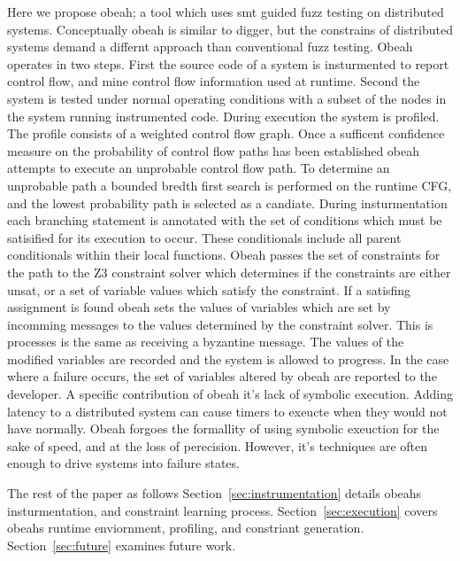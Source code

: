Here we propose obeah; a tool which uses smt guided fuzz testing on distributed
systems. Conceptually obeah is similar to digger, but the constrains of
distributed systems demand a differnt approach than conventional fuzz testing.
Obeah operates in two steps. First the source code of a system is insturmented
to report control flow, and mine control flow information used at runtime.
Second the system is tested under normal operating conditions with a subset of
the nodes in the system running instrumented code. During execution the system
is profiled. The profile consists of a weighted control flow graph. Once a
sufficent confidence measure on the probability of control flow paths has been
established obeah attempts to execute an unprobable control flow path. To
determine an unprobable path a bounded bredth first search is performed on the
runtime CFG, and the lowest probability path is selected as a candiate. During
insturmentation each branching statement is annotated with the set of
conditions which must be satisified for its execution to occur. These
conditionals include all parent conditionals within their local functions.
Obeah passes the set of constraints for the path to the Z3 constraint solver
which determines if the constraints are either unsat, or a set of variable
values which satisfy the constraint. If a satisfing assignment is found obeah
sets the values of variables which are set by incomming messages to the values
determined by the constraint solver. This is processes is the same as receiving
a byzantine message. The values of the modified variables are recorded and the
system is allowed to progress. In the case where a failure occurs, the set of
variables altered by obeah are reported to the developer. A specific
contribution of obeah it's lack of symbolic execution. Adding latency to a
distributed system can cause timers to exeucte when they would not have
normally. Obeah forgoes the formallity of using symbolic exeuction for the sake
of speed, and at the loss of perecision. However, it's techniques are often
enough to drive systems into failure states.


The rest of the paper as follows Section~\ref{sec:instrumentation} details
obeahs insturmentation, and constraint learning process.
Section~\ref{sec:execution} covers obeahs runtime enviornment, profiling, and
constriant generation. Section~\ref{sec:future} examines future work.


